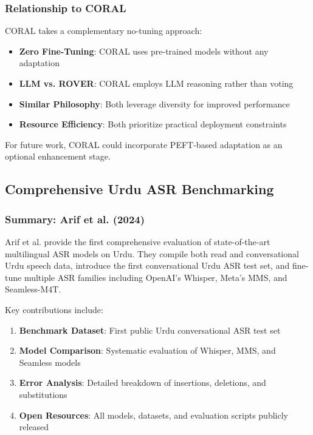 \subsubsection{Relationship to CORAL}

CORAL takes a complementary no-tuning approach:

\begin{itemize}[topsep=4pt,itemsep=2pt]
    \item \textbf{Zero Fine-Tuning}: CORAL uses pre-trained models without any adaptation
    \item \textbf{LLM vs. ROVER}: CORAL employs LLM reasoning rather than voting
    \item \textbf{Similar Philosophy}: Both leverage diversity for improved performance
    \item \textbf{Resource Efficiency}: Both prioritize practical deployment constraints
\end{itemize}

For future work, CORAL could incorporate PEFT-based adaptation as an optional enhancement stage.

\subsection{Comprehensive Urdu ASR Benchmarking}

\subsubsection{Summary: Arif et al. (2024)}

Arif et al. \cite{arif2024} provide the first comprehensive evaluation of state-of-the-art multilingual ASR models on Urdu. They compile both read and conversational Urdu speech data, introduce the first conversational Urdu ASR test set, and fine-tune multiple ASR families including OpenAI's Whisper, Meta's MMS, and Seamless-M4T.

Key contributions include:

\begin{enumerate}[topsep=6pt,itemsep=3pt]
    \item \textbf{Benchmark Dataset}: First public Urdu conversational ASR test set
    \item \textbf{Model Comparison}: Systematic evaluation of Whisper, MMS, and Seamless models
    \item \textbf{Error Analysis}: Detailed breakdown of insertions, deletions, and substitutions
    \item \textbf{Open Resources}: All models, datasets, and evaluation scripts publicly released
\end{enumerate}

